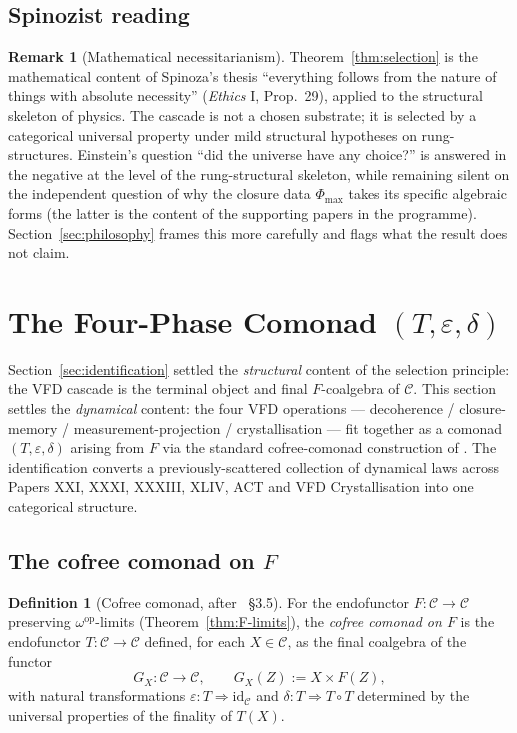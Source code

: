 \documentclass[11pt, a4paper]{amsart}
\theoremstyle{definition}
\newtheorem{definition}[theorem]{Definition}
\newtheorem{remark}[theorem]{Remark}
\newcommand{\catC}{\mathcal{C}}
\begin{document}
\subsection{Spinozist reading}

\begin{remark}[Mathematical necessitarianism]
\label{rmk:spinoza}
Theorem~\ref{thm:selection} is the mathematical content of
Spinoza's thesis ``everything follows from the nature of things
with absolute necessity'' (\emph{Ethics} I, Prop.~29), applied
to the structural skeleton of physics. The cascade is not a
chosen substrate; it is selected by a categorical universal
property under mild structural hypotheses on rung-structures.
Einstein's question ``did the universe have any choice?'' is
answered in the negative at the level of the
rung-structural skeleton, while remaining silent on the
independent question of why the closure data $\Phi_{\max}$ takes
its specific algebraic forms (the latter is the content of the
supporting papers in the programme). Section~\ref{sec:philosophy}
frames this more carefully and flags what the result does not
claim.
\end{remark}

\section{The Four-Phase Comonad $(T, \varepsilon, \delta)$}
\label{sec:comonad}

Section~\ref{sec:identification} settled the \emph{structural}
content of the selection principle: the VFD cascade is the
terminal object and final $F$-coalgebra of $\catC$. This section
settles the \emph{dynamical} content: the four VFD operations —
decoherence / closure-memory / measurement-projection /
crystallisation — fit together as a comonad $(T, \varepsilon,
\delta)$ arising from $F$ via the standard cofree-comonad
construction of \cite[\S 3.5]{Jacobs2017}. The identification
converts a previously-scattered collection of dynamical laws
across Papers XXI, XXXI, XXXIII, XLIV, ACT and VFD
Crystallisation into one categorical structure.

\subsection{The cofree comonad on $F$}

\begin{definition}[Cofree comonad, after
  \cite{Jacobs2017}~\S 3.5]
\label{def:cofree-comonad}
For the endofunctor $F \colon \catC \to \catC$ preserving
$\omega^{\mathrm{op}}$-limits (Theorem~\ref{thm:F-limits}), the
\emph{cofree comonad on $F$} is the endofunctor $T \colon
\catC \to \catC$ defined, for each $X \in \catC$, as the final
coalgebra of the functor
\[
    G_X \colon \catC \to \catC, \qquad
    G_X(Z) := X \times F(Z),
\]
with natural transformations $\varepsilon \colon T \Rightarrow
\mathrm{id}_\catC$ and $\delta \colon T \Rightarrow T \circ T$
determined by the universal properties of the finality of
$T(X)$.
\end{definition}
\end{document}
